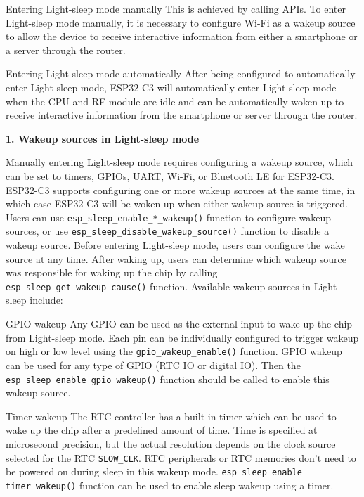 \documentclass[a4paper,12pt]{book}
\begin{document}
\begin{term}{Entering Light-sleep mode manually}
    This is achieved by calling APIs. To enter Light-sleep mode manually, it is necessary to configure Wi-Fi as a wakeup source to allow the device to receive interactive information from either a smartphone or a server through the router.
\end{term}

\begin{term}{Entering Light-sleep mode automatically}
    After being configured to automatically enter Light-sleep mode, ESP32-C3 will automatically enter Light-sleep mode when the CPU and RF module are idle and can be automatically woken up to receive interactive information from the smartphone or server through the router.
\end{term}

\textbf{1. Wakeup sources in Light-sleep mode}

Manually entering Light-sleep mode requires configuring a wakeup source, which can be set to timers, GPIOs, UART, Wi-Fi, or Bluetooth LE for ESP32-C3. ESP32-C3 supports configuring one or more wakeup sources at the same time, in which case ESP32-C3 will be woken up when either wakeup source is triggered. Users can use \verb|esp_sleep_enable_*_wakeup()| function to configure wakeup sources, or use \verb|esp_sleep_disable_wakeup_source()| function to disable a wakeup source. Before entering Light-sleep mode, users can configure the wake source at any time. After waking up, users can determine which wakeup source was responsible for waking up the chip by calling \verb|esp_sleep_get_wakeup_cause()| function. Available wakeup sources in Light-sleep include:

\begin{term}{GPIO wakeup}
    Any GPIO can be used as the external input to wake up the chip from Light-sleep mode. Each pin can be individually configured to trigger wakeup on high or low level using the \verb|gpio_wakeup_enable()| function. GPIO wakeup can be used for any type of GPIO (RTC IO or digital IO). Then the \verb|esp_sleep_enable_gpio_wakeup()| function should be called to enable this wakeup source.
\end{term}

\begin{term}{Timer wakeup}
    The RTC controller has a built-in timer which can be used to wake up the chip after a predefined amount of time. Time is specified at microsecond precision, but the actual resolution depends on the clock source selected for the RTC \verb|SLOW_CLK|. RTC peripherals or RTC memories don’t need to be powered on during sleep in this wakeup mode. \verb|esp_sleep_enable_ timer_wakeup()| function can be used to enable sleep wakeup using a timer.
\end{term}
\end{document}
